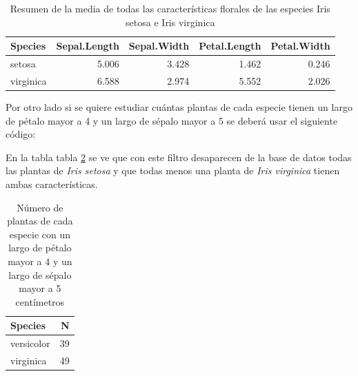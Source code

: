 \documentclass[]{book}
\newenvironment{Shaded}{\begin{snugshade}}{\end{snugshade}}
\newcommand{\DataTypeTok}[1]{\textcolor[rgb]{0.13,0.29,0.53}{#1}}
\newcommand{\DecValTok}[1]{\textcolor[rgb]{0.00,0.00,0.81}{#1}}
\newcommand{\KeywordTok}[1]{\textcolor[rgb]{0.13,0.29,0.53}{\textbf{#1}}}
\newcommand{\NormalTok}[1]{#1}
\newcommand{\OperatorTok}[1]{\textcolor[rgb]{0.81,0.36,0.00}{\textbf{#1}}}
\newcommand{\StringTok}[1]{\textcolor[rgb]{0.31,0.60,0.02}{#1}}
\begin{document}
\begin{table}

\caption{\label{tab:MenosVersicolor}Resumen de la media de todas las características florales de las especies Iris setosa e Iris virginica}
\centering
\begin{tabular}[t]{lrrrr}
\toprule
Species & Sepal.Length & Sepal.Width & Petal.Length & Petal.Width\\
\midrule
setosa & 5.006 & 3.428 & 1.462 & 0.246\\
virginica & 6.588 & 2.974 & 5.552 & 2.026\\
\bottomrule
\end{tabular}
\end{table}

Por otro lado si se quiere estudiar cuántas plantas de cada especie
tienen un largo de pétalo mayor a 4 y un largo de sépalo mayor a 5 se
deberá usar el siguiente código:

\begin{Shaded}
\end{Shaded}

En la tabla tabla \ref{tab:Numero} se ve que con este filtro desaparecen
de la base de datos todas las plantas de \emph{Iris setosa} y que todas
menos una planta de \emph{Iris virginica} tienen ambas características.

\begin{table}

\caption{\label{tab:Numero}Número de plantas de cada especie con un largo de pétalo mayor a 4 y un largo de sépalo mayor a 5 centímetros}
\centering
\begin{tabular}[t]{lr}
\toprule
Species & N\\
\midrule
versicolor & 39\\
virginica & 49\\
\bottomrule
\end{tabular}
\end{table}
\end{document}

